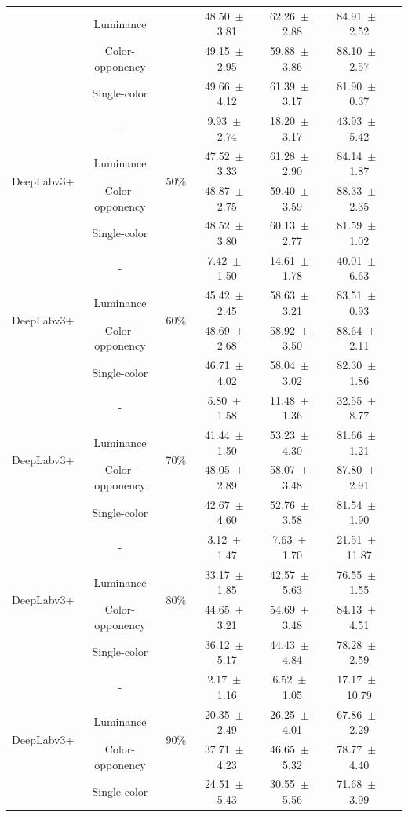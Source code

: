 \begin{table}[h]
\begin{tabular}{@{}lccc ccc@{}}
& Luminance & & 48.50~$\pm$~3.81 & 62.26~$\pm$~2.88 & 84.91~$\pm$~2.52 \\
& Color-opponency & & 49.15~$\pm$~2.95 & 59.88~$\pm$~3.86 & 88.10~$\pm$~2.57 \\
& Single-color & & 49.66~$\pm$~4.12 & 61.39~$\pm$~3.17 & 81.90~$\pm$~0.37 \\
\midrule
\multirow{4}{*}{DeepLabv3+} & - & \multirow{4}{*}{50\%} & 9.93~$\pm$~2.74 & 18.20~$\pm$~3.17 & 43.93~$\pm$~5.42 \\
& Luminance & & 47.52~$\pm$~3.33 & 61.28~$\pm$~2.90 & 84.14~$\pm$~1.87 \\
& Color-opponency & & 48.87~$\pm$~2.75 & 59.40~$\pm$~3.59 & 88.33~$\pm$~2.35 \\
& Single-color & & 48.52~$\pm$~3.80 & 60.13~$\pm$~2.77 & 81.59~$\pm$~1.02 \\
\midrule
\multirow{4}{*}{DeepLabv3+} & - & \multirow{4}{*}{60\%} & 7.42~$\pm$~1.50 & 14.61~$\pm$~1.78 & 40.01~$\pm$~6.63 \\
& Luminance & & 45.42~$\pm$~2.45 & 58.63~$\pm$~3.21 & 83.51~$\pm$~0.93 \\
& Color-opponency & & 48.69~$\pm$~2.68 & 58.92~$\pm$~3.50 & 88.64~$\pm$~2.11 \\
& Single-color & & 46.71~$\pm$~4.02 & 58.04~$\pm$~3.02 & 82.30~$\pm$~1.86 \\
\midrule
\multirow{4}{*}{DeepLabv3+} & - & \multirow{4}{*}{70\%} & 5.80~$\pm$~1.58 & 11.48~$\pm$~1.36 & 32.55~$\pm$~8.77 \\
& Luminance & & 41.44~$\pm$~1.50 & 53.23~$\pm$~4.30 & 81.66~$\pm$~1.21 \\
& Color-opponency & & 48.05~$\pm$~2.89 & 58.07~$\pm$~3.48 & 87.80~$\pm$~2.91 \\
& Single-color & & 42.67~$\pm$~4.60 & 52.76~$\pm$~3.58 & 81.54~$\pm$~1.90 \\
\midrule
\multirow{4}{*}{DeepLabv3+} & - & \multirow{4}{*}{80\%} & 3.12~$\pm$~1.47 & 7.63~$\pm$~1.70 & 21.51~$\pm$~11.87 \\
& Luminance & & 33.17~$\pm$~1.85 & 42.57~$\pm$~5.63 & 76.55~$\pm$~1.55 \\
& Color-opponency & & 44.65~$\pm$~3.21 & 54.69~$\pm$~3.48 & 84.13~$\pm$~4.51 \\
& Single-color & & 36.12~$\pm$~5.17 & 44.43~$\pm$~4.84 & 78.28~$\pm$~2.59 \\
\midrule
\multirow{4}{*}{DeepLabv3+} & - & \multirow{4}{*}{90\%} & 2.17~$\pm$~1.16 & 6.52~$\pm$~1.05 & 17.17~$\pm$~10.79 \\
& Luminance & & 20.35~$\pm$~2.49 & 26.25~$\pm$~4.01 & 67.86~$\pm$~2.29 \\
& Color-opponency & & 37.71~$\pm$~4.23 & 46.65~$\pm$~5.32 & 78.77~$\pm$~4.40 \\
& Single-color & & 24.51~$\pm$~5.43 & 30.55~$\pm$~5.56 & 71.68~$\pm$~3.99 \\
\midrule
\bottomrule
\end{tabular}
\label{tab:sparse_results_deeplabv3plus_acdc_fog}
\end{table}